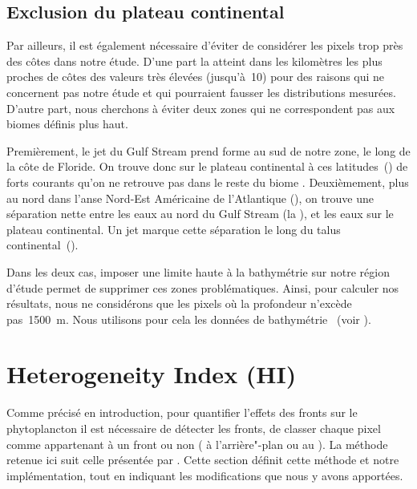 \subsection{Exclusion du plateau continental}

Par ailleurs, il est également nécessaire d'éviter de considérer les pixels trop près des côtes dans notre étude.
D'une part la  atteint dans les kilomètres les plus proches de côtes des valeurs très élevées (jusqu'à~\qty{10}{\mgm}) pour des raisons qui ne concernent pas notre étude et qui pourraient fausser les distributions mesurées.
D'autre part, nous cherchons à éviter deux zones qui ne correspondent pas aux biomes définis plus haut.

Premièrement, le jet du Gulf Stream prend forme au sud de notre zone, le long de la côte de Floride. On trouve donc sur le plateau continental à ces latitudes~(\tapprox{}) de forts courants qu'on ne retrouve pas dans le reste du biome .
Deuxièmement, plus au nord dans l'anse Nord-Est Américaine de l'Atlantique (), on trouve une séparation nette entre les eaux au nord du Gulf Stream (la ), et les eaux sur le plateau continental.
Un jet marque cette séparation le long du talus continental~(\cite{flagg_2006}).

Dans les deux cas, imposer une limite haute à la bathymétrie sur notre région d'étude permet de supprimer ces zones problématiques.
Ainsi, pour calculer nos résultats, nous ne considérons que les pixels où la profondeur n'excède pas~\qty{1500}{\m}.
Nous utilisons pour cela les données de bathymétrie ~(voir ).

\section{Heterogeneity Index (HI)}
\label{sec:HI}

Comme précisé en introduction, pour quantifier l'effets des fronts sur le phytoplancton il est nécessaire de détecter les fronts,  de classer chaque pixel comme appartenant à un front ou non ( à l'arrière"-plan ou au ).
La méthode retenue ici suit celle présentée par \textcite{liu_2016} .
Cette section définit cette méthode et notre implémentation, tout en indiquant les modifications que nous y avons apportées.


